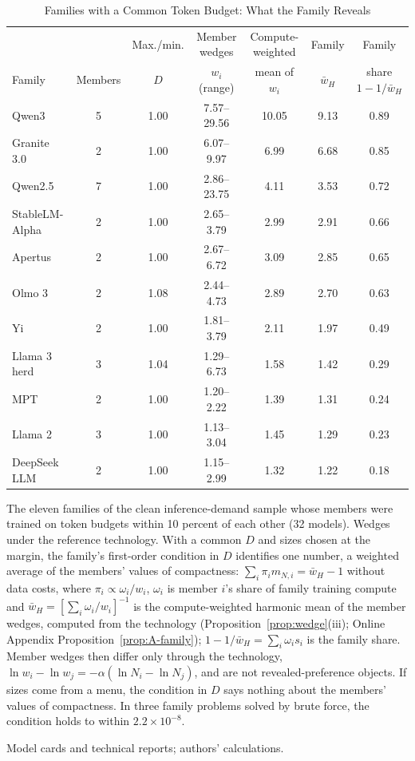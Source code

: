 \begin{table}[tp]
\centering
\caption{Families with a Common Token Budget: What the Family Reveals}
\label{tab:app-family-budgets}
\footnotesize
\setlength{\tabcolsep}{3pt}
\begin{tabular*}{\textwidth}{@{\extracolsep{\fill}}lcccccc@{}}
\toprule
 & & Max./min. & Member wedges & Compute-weighted & Family & Family \\
Family & Members & $D$ & $w_i$ (range) & mean of $w_i$ & $\bar w_H$ & share $1-1/\bar w_H$ \\
\midrule
Qwen3 & 5 & 1.00 & 7.57--29.56 & 10.05 & 9.13 & 0.89 \\
Granite 3.0 & 2 & 1.00 & 6.07--9.97 & 6.99 & 6.68 & 0.85 \\
Qwen2.5 & 7 & 1.00 & 2.86--23.75 & 4.11 & 3.53 & 0.72 \\
StableLM-Alpha & 2 & 1.00 & 2.65--3.79 & 2.99 & 2.91 & 0.66 \\
Apertus & 2 & 1.00 & 2.67--6.72 & 3.09 & 2.85 & 0.65 \\
Olmo 3 & 2 & 1.08 & 2.44--4.73 & 2.89 & 2.70 & 0.63 \\
Yi & 2 & 1.00 & 1.81--3.79 & 2.11 & 1.97 & 0.49 \\
Llama 3 herd & 3 & 1.04 & 1.29--6.73 & 1.58 & 1.42 & 0.29 \\
MPT & 2 & 1.00 & 1.20--2.22 & 1.39 & 1.31 & 0.24 \\
Llama 2 & 3 & 1.00 & 1.13--3.04 & 1.45 & 1.29 & 0.23 \\
DeepSeek LLM & 2 & 1.00 & 1.15--2.99 & 1.32 & 1.22 & 0.18 \\
\bottomrule
\end{tabular*}
\par\smallskip
\begin{tablenotes}
The eleven families of the clean inference-demand sample whose members were trained on token budgets within 10 percent
of each other (32 models). Wedges under the reference technology. With a common $D$ and sizes chosen at the margin, the
family's first-order condition in $D$ identifies one number, a weighted average of the members' values of compactness:
$\sum_i\pi_im_{N,i}=\bar w_H-1$ without data costs, where $\pi_i\propto\omega_i/w_i$, $\omega_i$ is member $i$'s share
of family training compute and $\bar w_H=[\sum_i\omega_i/w_i]^{-1}$ is the compute-weighted harmonic mean of the member
wedges, computed from the technology (Proposition~\ref{prop:wedge}(iii); Online Appendix
Proposition~\ref{prop:A-family}); $1-1/\bar w_H=\sum_i\omega_is_i$ is the family share. Member wedges then differ only through the technology, $\ln w_i-\ln w_j=-\alpha(\ln N_i-\ln N_j)$, and are not
revealed-preference objects. If sizes come from a menu, the condition in $D$ says nothing about the members' values of
compactness. In three family problems solved by brute force, the condition holds to within $2.2\times10^{-8}$.
\end{tablenotes}
\begin{tablenotes}[Source]
Model cards and technical reports; authors' calculations.
\end{tablenotes}
\end{table}
